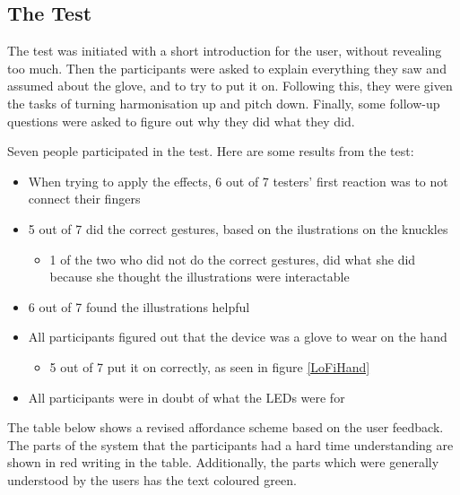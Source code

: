 \subsection{The Test}

The test was initiated with a short introduction for the user, without revealing too much. Then the participants were asked to explain everything they saw and assumed about the glove, and to try to put it on. Following this, they were given the tasks of turning harmonisation up and pitch down. Finally, some follow-up questions were asked to figure out why they did what they did.

Seven people participated in the test. Here are some results from the test:

\begin{itemize}
	\item When trying to apply the effects, 6 out of 7 testers' first reaction was to not connect their fingers
	\item 5 out of 7 did the correct gestures, based on the ilustrations on the knuckles
	\begin{itemize}
		\item 1 of the two who did not do the correct gestures, did what she did because she thought the illustrations were interactable
	\end{itemize}
	\item 6 out of 7 found the illustrations helpful
	\item All participants figured out that the device was a glove to wear on the hand
	\begin{itemize}
		\item 5 out of 7 put it on correctly, as seen in figure \ref{LoFiHand}
	\end{itemize}
	\item All participants were in doubt of what the LEDs were for
\end{itemize}

The table below shows a revised affordance scheme based on the user feedback. The parts of the system that the participants had a hard time understanding are shown in red writing in the table. Additionally, the parts which were generally understood by the users has the text coloured green.

